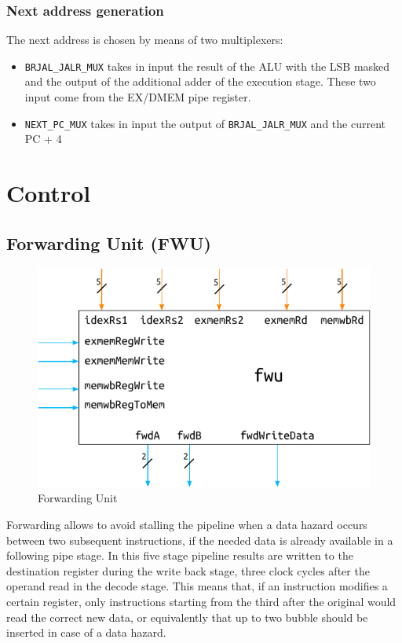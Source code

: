 \documentclass[a4paper]{article}
\begin{document}
\subsubsection{Next address generation}
The next address is chosen by means of two multiplexers:
\begin{itemize}
    \item \texttt{BRJAL\_JALR\_MUX} takes in input the result of the ALU with the LSB masked and the output of the additional adder of the execution stage. These two input come from the EX/DMEM pipe register.
    \item \texttt{NEXT\_PC\_MUX} takes in input the output of \texttt{BRJAL\_JALR\_MUX} and the current PC + 4
\end{itemize}

\section{Control}
\subsection{Forwarding Unit (FWU)}

\begin{figure}[hbtp]
    \centering
    \includegraphics[]{../fwu/ref/schematic/fwu.pdf}
    \caption{Forwarding Unit}
    \label{fig:fwu}
\end{figure}

Forwarding allows to avoid stalling the pipeline when a data hazard occurs between two subsequent instructions, if the needed data is already available in a following pipe stage. 
In this five stage pipeline results are written to the destination register during the write back stage, three clock cycles after the operand read in the decode stage. This means that, if an instruction modifies a certain register, only instructions starting from the third after the original would read the correct new data, or equivalently that up to two bubble should be inserted in case of a data hazard.
\end{document}

